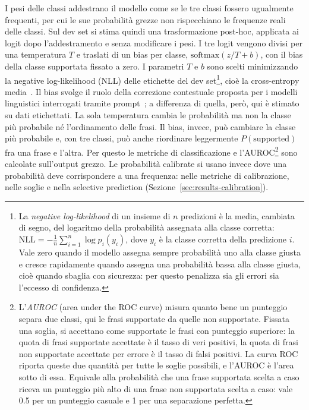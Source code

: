 I pesi delle classi addestrano il modello come se le tre classi fossero ugualmente frequenti, per cui le sue
probabilità grezze non rispecchiano le frequenze reali delle classi. Sul dev set si stima quindi una trasformazione
post-hoc, applicata ai logit dopo l'addestramento e senza modificare i pesi. I tre logit vengono divisi per una
temperatura $T$ e traslati di un bias per classe, $\mathrm{softmax}(z / T + b)$, con il bias della classe supportata
fissato a zero. I parametri $T$ e $b$ sono scelti minimizzando la negative log-likelihood (NLL) delle etichette del dev
set\footnote{La \emph{negative log-likelihood} di un insieme di $n$ predizioni è la media, cambiata di segno, del logaritmo della probabilità assegnata alla classe corretta: $\mathrm{NLL} = -\frac{1}{n}\sum_{i=1}^{n} \log p_i(y_i)$, dove $y_i$ è la classe corretta della predizione $i$. Vale zero quando il modello assegna sempre probabilità uno alla classe giusta e cresce rapidamente quando assegna una probabilità bassa alla classe giusta, cioè quando sbaglia con sicurezza: per questo penalizza sia gli errori sia l'eccesso di confidenza.}, cioè la cross-entropy media~\cite{guo2017calibration}. Il bias svolge il ruolo della correzione contestuale proposta per
i modelli linguistici interrogati tramite prompt~\cite{zhao2021calibrate}; a differenza di quella, però, qui è stimato
su dati etichettati. La sola temperatura cambia le probabilità ma non la classe più probabile né l'ordinamento delle
frasi. Il bias, invece, può cambiare la classe più probabile e, con tre classi, può anche riordinare leggermente
$P(\text{supported})$ fra una frase e l'altra. Per questo le metriche di classificazione e
l'AUROC\footnote{L'\emph{AUROC} (area under the ROC curve) misura quanto bene un punteggio separa due classi, qui
le frasi supportate da quelle non supportate. Fissata una soglia, si accettano come supportate le frasi con punteggio
superiore: la quota di frasi supportate accettate è il tasso di veri positivi, la quota di frasi non supportate
accettate per errore è il tasso di falsi positivi. La curva ROC riporta queste due quantità per tutte le soglie
possibili, e l'AUROC è l'area sotto di essa. Equivale alla probabilità che una frase supportata scelta a caso riceva un
punteggio più alto di una frase non supportata scelta a caso: vale 0.5 per un punteggio casuale e 1 per una
separazione perfetta.} sono
calcolate sull'output grezzo. Le probabilità calibrate si usano invece dove una probabilità deve corrispondere a una
frequenza: nelle metriche di calibrazione, nelle soglie e nella selective prediction
(Sezione~\ref{sec:results-calibration}).

